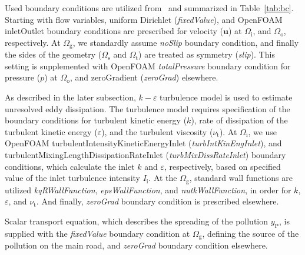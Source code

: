 Used boundary conditions are utilized from~\cite{kadaverugu21,Pantusheva22} and summarized in Table~\ref{tab:bc}. Starting with flow variables, uniform Dirichlet (\textit{fixedValue}), and OpenFOAM inletOutlet boundary conditions are prescribed for velocity ($\bm{u}$) at $\Omega_{\mathrm{i}}$, and $\Omega_{\mathrm{o}}$, respectively. At $\Omega_{\mathrm{g}}$, we standardly assume \textit{noSlip} boundary condition, and finally the sides of the geometry ($\Omega_{\mathrm{s}}$ and $\Omega_{\mathrm{t}}$) are treated as symmetry (\textit{slip}). This setting is supplemented with OpenFOAM \textit{totalPressure} boundary condition for pressure ($p$) at $\Omega_{\mathrm{o}}$, and zeroGradient (\textit{zeroGrad}) elsewhere. 

As described in the later subsection, $k-\varepsilon$ turbulence model is used to estimate unresolved eddy dissipation. The turbulence model requires specification of the boundary conditions for turbulent kinetic energy ($k$), rate of dissipation of the turbulent kinetic energy ($\varepsilon$), and the turbulent viscosity ($\nu_{\mathrm{t}}$). At $\Omega_{\mathrm{i}}$, we use OpenFOAM turbulentIntensityKineticEnergyInlet (\textit{turbIntKinEngInlet}), and turbulentMixingLengthDissipationRateInlet (\textit{turbMixDissRateInlet}) boundary conditions, which calculate the inlet $k$ and $\varepsilon$, respectively, based on specified value of the inlet turbulence intensity $I_{\mathrm{i}}$. At the $\Omega_{\mathrm{g}}$, standard wall functions are utilized \textit{kqRWallFunction}, \textit{epsWallFunction}, and \textit{nutkWallFunction}, in order for $k$, $\varepsilon$, and $\nu_{\mathrm{t}}$. And finally, \textit{zeroGrad} boundary condition is prescribed elsewhere.

Scalar transport equation, which describes the spreading of the pollution $y_{\mathrm{P}}$, is supplied with the \textit{fixedValue} boundary condition at $\Omega_{\mathrm{g}}$, defining the source of the pollution on the main road, and \textit{zeroGrad} boundary condition elsewhere.

